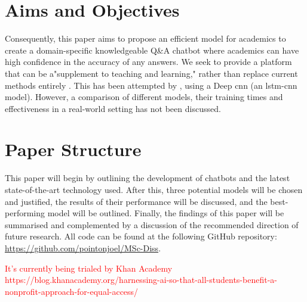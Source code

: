 \section{Aims and Objectives} %
\label{sec:intro_aims_and_objectives}

Consequently, this paper aims to propose an efficient model for academics to create a domain-specific knowledgeable Q\&A chatbot where academics can have high confidence in the accuracy of any answers. We seek to provide a platform that can be a"supplement to teaching and learning," rather than replace current methods entirely \citep{Nee2023ExploringTT}. This has been attempted by \citep{Chen22}, using a Deep \acrlong{cnn} (an \acrshort{lstm}-\acrshort{cnn} model). However, a comparison of different models, their training times and effectiveness in a real-world setting has not been discussed.


\section{Paper Structure}
\label{sec:intro_paper_structure}

This paper will begin by outlining the development of chatbots and the latest state-of-the-art technology used. After this, three potential models will be chosen and justified, the results of their performance will be discussed, and the best-performing model will be outlined. Finally, the findings of this paper will be summarised and complemented by a discussion of the recommended direction of future research. All code can be found at the following GitHub repository: \url{https://github.com/pointonjoel/MSc-Diss}. %

\textcolor{red}{It's currently being trialed by Khan Academy https://blog.khanacademy.org/harnessing-ai-so-that-all-students-benefit-a-nonprofit-approach-for-equal-access/}